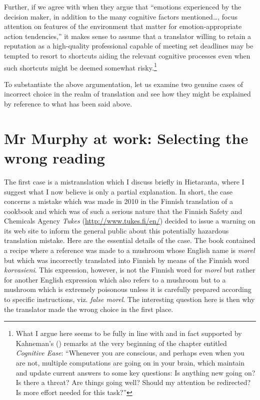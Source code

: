 \documentclass[output=paper]{LSP/langsci}
\begin{document}
Further, if we agree with \citet[59]{Weber2009} when they argue that ``emotions experienced by the decision maker, in addition to the many cognitive factors mentioned\ldots , focus attention on features of the environment that matter for emotion-appropriate action tendencies,'' it makes sense to assume that a translator willing to retain a reputation as a high-quality professional capable of meeting set deadlines may be tempted to resort to shortcuts aiding the relevant cognitive processes even when such shortcuts might be deemed somewhat risky.\footnote{What I argue here seems to be fully in line with and in fact supported by Kahneman's (\citeyear{Kahneman2011}) remarks at the very beginning of the chapter entitled \textit{Cognitive Ease}: ``Whenever you are conscious, and perhaps even when you are not, multiple computations are going on in your brain, which maintain and update current answers to some key questions: Is anything new going on? Is there a threat? Are things going well? Should my attention be redirected? Is more effort needed for this task?''}

To substantiate the above argumentation, let us examine two genuine cases of incorrect choice in the realm of translation and see how they might be explained by reference to what has been said above.

\section{Mr Murphy at work: Selecting the wrong reading}\label{hietaranta:sec:3}

The first case is a mistranslation which I discuss briefly in Hietaranta, where I suggest what I now believe is only a partial explanation. In short, the case concerns a mistake which was made in 2010 in the Finnish translation of a cookbook and which was of such a serious nature that the Finnish Safety and Chemicals Agency \textit{Tukes} (\url{http://www.tukes.fi/en/}) decided to issue a warning on its web site to inform the general public about this potentially hazardous translation mistake. Here are the essential details of the case. The book contained a recipe where a reference was made to a mushroom whose English name is \textit{morel} but which was incorrectly translated into Finnish by means of the Finnish word \textit{korvasieni}. This expression, however, is not the Finnish word for \textit{morel} but rather for another English expression which also refers to a mushroom but to a mushroom which is extremely poisonous unless it is carefully prepared according to specific instructions, viz. \textit{false morel}. The interesting question here is then why the translator made the wrong choice in the first place.
\end{document}
